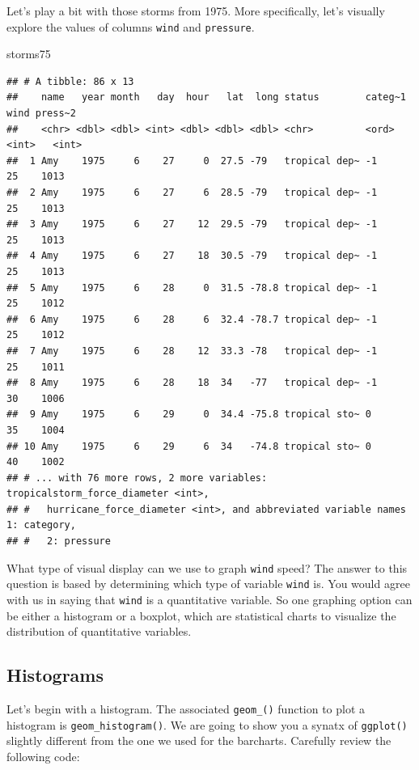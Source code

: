 \documentclass[
]{book}
\newenvironment{Shaded}{\begin{snugshade}}{\end{snugshade}}
\newcommand{\NormalTok}[1]{#1}
\begin{document}
Let's play a bit with those storms from 1975. More specifically, let's visually
explore the values of columns \texttt{wind} and \texttt{pressure}.

\begin{Shaded}
\begin{Highlighting}[]
\NormalTok{storms75}
\end{Highlighting}
\end{Shaded}

\begin{verbatim}
## # A tibble: 86 x 13
##    name   year month   day  hour   lat  long status        categ~1  wind press~2
##    <chr> <dbl> <dbl> <int> <dbl> <dbl> <dbl> <chr>         <ord>   <int>   <int>
##  1 Amy    1975     6    27     0  27.5 -79   tropical dep~ -1         25    1013
##  2 Amy    1975     6    27     6  28.5 -79   tropical dep~ -1         25    1013
##  3 Amy    1975     6    27    12  29.5 -79   tropical dep~ -1         25    1013
##  4 Amy    1975     6    27    18  30.5 -79   tropical dep~ -1         25    1013
##  5 Amy    1975     6    28     0  31.5 -78.8 tropical dep~ -1         25    1012
##  6 Amy    1975     6    28     6  32.4 -78.7 tropical dep~ -1         25    1012
##  7 Amy    1975     6    28    12  33.3 -78   tropical dep~ -1         25    1011
##  8 Amy    1975     6    28    18  34   -77   tropical dep~ -1         30    1006
##  9 Amy    1975     6    29     0  34.4 -75.8 tropical sto~ 0          35    1004
## 10 Amy    1975     6    29     6  34   -74.8 tropical sto~ 0          40    1002
## # ... with 76 more rows, 2 more variables: tropicalstorm_force_diameter <int>,
## #   hurricane_force_diameter <int>, and abbreviated variable names 1: category,
## #   2: pressure
\end{verbatim}

What type of visual display can we use to graph \texttt{wind} speed? The answer to
this question is based by determining which type of variable \texttt{wind} is.
You would agree with us in saying that \texttt{wind} is a quantitative variable. So
one graphing option can be either a histogram or a boxplot, which are
statistical charts to visualize the distribution of quantitative variables.

\hypertarget{histograms}{%
\subsection{Histograms}\label{histograms}}

Let's begin with a histogram. The associated \texttt{geom\_()} function to plot a
histogram is \texttt{geom\_histogram()}. We are going to show you a synatx of
\texttt{ggplot()} slightly different from the one we used for the barcharts.
Carefully review the following code:
\end{document}
